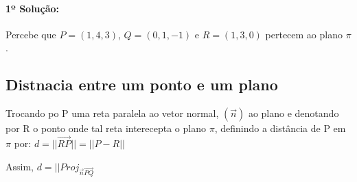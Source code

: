 \paragraph{1º Solução:} Percebe que $P=(1,4,3)$, $Q=(0,1,-1)$ e $R = (1,3,0)$ pertecem ao plano $\pi$. 

\subsection{Distnacia entre um ponto e um plano}

Trocando po P uma reta paralela ao vetor normal, $(\overrightarrow{n})$ ao plano e denotando por R o ponto onde tal reta interecepta o plano $\pi$, definindo a distância de P em $\pi$ por:
$d = || \overrightarrow{RP} || = || P-R || $

Assim, 
$d = || Proj_{\overrightarrow{n} \overrightarrow{PQ}}$